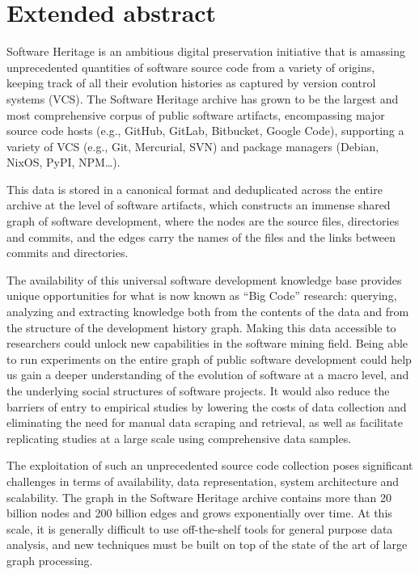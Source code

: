\clearpage

\chapter*{Extended abstract}

Software Heritage is an ambitious digital preservation initiative that is
amassing unprecedented quantities of software source code from a variety of
origins, keeping track of all their evolution histories as captured by version
control systems (VCS). The Software Heritage archive has grown to be the
largest and most comprehensive corpus of public software artifacts,
encompassing major source code hosts (e.g., GitHub, GitLab, Bitbucket,
Google Code), supporting a variety of VCS (e.g., Git, Mercurial, SVN) and
package managers (Debian, NixOS, PyPI, NPM…).

This data is stored in a canonical format and deduplicated across the entire
archive at the level of software artifacts, which constructs an immense shared
graph of software development, where the nodes are the source files,
directories and commits, and the edges carry the names of the files and the
links between commits and directories.

The availability of this universal software development knowledge base provides
unique opportunities for what is now known as “Big Code” research: querying,
analyzing and extracting knowledge both from the contents of the data and from
the structure of the development history graph. Making this data accessible to
researchers could unlock new capabilities in the software mining field. Being
able to run experiments on the entire graph of public software development
could help us gain a deeper understanding of the evolution of software at a
macro level, and the underlying social structures of software projects. It
would also reduce the barriers of entry to empirical studies by lowering the
costs of data collection and eliminating the need for manual data scraping and
retrieval, as well as facilitate replicating studies at a large scale using
comprehensive data samples.

The exploitation of such an unprecedented source code collection poses
significant challenges in terms of availability, data representation, system
architecture and scalability. The graph in the Software Heritage archive
contains more than 20 billion nodes and 200 billion edges and grows
exponentially over time. At this scale, it is generally difficult to use
off-the-shelf tools for general purpose data analysis, and new techniques must
be built on top of the state of the art of large graph processing.

